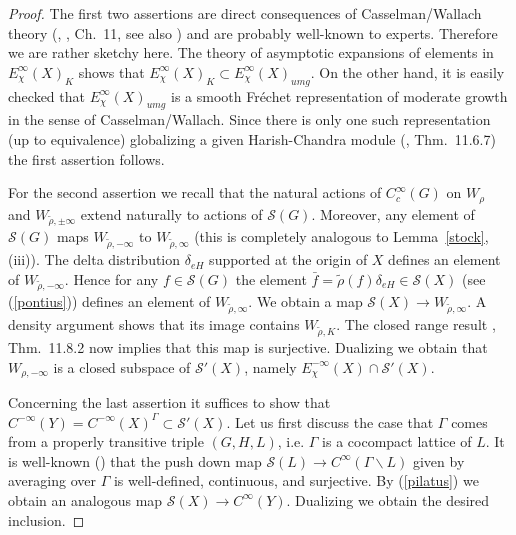 \documentclass[10]{amsart}
\theoremstyle{remark}
\theoremstyle{definition}
\numberwithin{equation}{section}
\newcommand{\Cal}{\mathcal}
\begin{document}
{\begin{proof} The first two assertions are direct consequences of Casselman/Wallach theory (\cite{Cas89b}, \cite{Wa92}, Ch.~11, see also \cite{BK14}) and are probably well-known to experts. Therefore we are rather sketchy here. The theory of asymptotic expansions of elements in $E^{\infty}_\chi(X)_K$ shows that $E^{\infty}_\chi(X)_K\subset E^{\infty}_\chi(X)_{umg}$.
On the other hand, it is easily checked that $E^{\infty}_\chi(X)_{umg}$ is a smooth Fr\' echet representation of moderate growth in the sense of Casselman/Wallach. Since there is only
one such representation (up to equivalence) globalizing a given Harish-Chandra module (\cite{Wa92}, Thm.~11.6.7) the first assertion follows.

For the second assertion we recall that the natural actions of $C_c^\infty(G)$ on $W_\rho$ and $W_{\tilde\rho,\pm\infty}$ extend naturally to actions of ${\Cal S}(G)$.
Moreover, any element of ${\Cal S}(G)$ maps $W_{\tilde\rho,-\infty}$ to $W_{\tilde\rho,\infty}$ (this is completely analogous to Lemma~\ref{stock}, (iii)). The delta distribution 
$\delta_{eH}$
supported at the origin of $X$ defines an element of $W_{\tilde\rho,-\infty}$. Hence for any $f\in  {\Cal S}(G)$ the element $\bar f =\tilde\rho(f)\delta_{eH}\in  {\Cal S}(X)$ (see (\ref{pontius}))
defines an element of $W_{\tilde\rho,\infty}$. We obtain a map ${\Cal S}(X)\rightarrow W_{\tilde\rho,\infty}$. A density argument shows that its image contains $W_{\tilde\rho,K}$.
The closed range result \cite{Wa92}, Thm.~11.8.2 now implies that this map is surjective. Dualizing we obtain that $W_{\rho,-\infty}$ is a closed subspace of ${\Cal S}'(X)$, namely 
$E^{-\infty}_\chi(X)\cap {\Cal S}'(X)$.

Concerning the last assertion it suffices to show that $C^{-\infty}(Y)=C^{-\infty}(X)^\Gamma\subset {\Cal S}'(X)$.
Let us first discuss the case that $\Gamma$ comes from a properly transitive triple $(G,H,L)$, i.e. $\Gamma$ is a cocompact lattice of $L$.
It is well-known (\cite{Cas89}) that the push down map
${\Cal S}(L)\rightarrow C^\infty(\Gamma\backslash L)$ given by averaging over $\Gamma$ is well-defined, continuous, and surjective. By (\ref{pilatus}) we obtain an analogous map
${\Cal S}(X)\rightarrow C^\infty(Y)$. Dualizing we obtain the desired inclusion.


\end{proof}}
\end{document}
